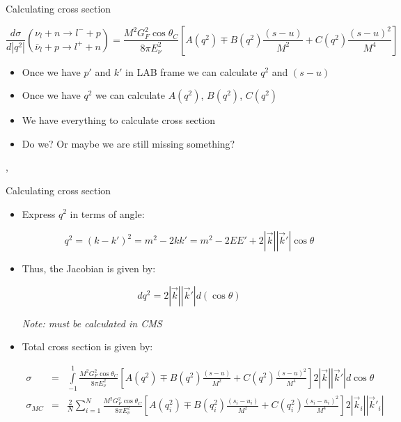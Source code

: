 \begin{wideslide}[toc=]{Calculating cross section}
\null\vfill

  
  $$\frac{d\sigma}{d|q^2|} {{\nu_l + n \rightarrow l^- + p}\choose{\bar\nu_l + p \rightarrow l^+ + n}} = \frac{M^2G_F^2\cos\theta_C}{8\pi E_\nu^2}\left[A(q^2) \mp B(q^2)\frac{(s - u)}{M^2} + C(q^2)\frac{(s - u)^2}{M^4}\right]$$
  

  \begin{itemize}
    \item Once we have $p'$ and $k'$ in LAB frame we can calculate $q^2$ and $(s - u)$
    \item Once we have $q^2$ we can calculate $A(q^2)$, $B(q^2)$, $C(q^2)$
    \item We have everything to calculate cross section
    \item Do we? Or maybe we are still missing something?
  \end{itemize}
  \sep

\vfill\null
\end{wideslide}

\begin{wideslide}[toc=]{Calculating cross section}
\null\vfill

  \begin{itemize}
    
    \item Express $q^2$ in terms of angle:
    
    $$q^2 = (k - k')^2 = m^2 - 2kk' = m^2 - 2EE' + 2|\vec k||\vec k'|\cos\theta $$
    
    \item Thus, the Jacobian is given by:
    
    $$dq^2 = 2|\vec k||\vec k'|d(\cos\theta)$$
    
    {\it\color{pdcolor3}Note: must be calculated in CMS}
    
    \item Total cross section is given by:
    
    {\small
    \begin{eqnarray*}
      \sigma      & = & \int\limits_{-1}^{1} \frac{M^2G_F^2\cos\theta_C}{8\pi E_\nu^2}\left[A(q^2) \mp B(q^2)\frac{(s - u)}{M^2} + C(q^2)\frac{(s - u)^2}{M^4}\right]2|\vec k||\vec k'|d\cos\theta \\
      \sigma_{MC} & = & \frac{2}{N}\sum\limits_{i = 1}^N \frac{M^2G_F^2\cos\theta_C}{8\pi E_\nu^2}\left[A(q_i^2) \mp B(q_i^2)\frac{(s_i - u_i)}{M^2} + C(q_i^2)\frac{(s_i - u_i)^2}{M^4}\right]2|\vec k_i||\vec k'_i|
    \end{eqnarray*}
    }
  \end{itemize}

\vfill\null
\end{wideslide}

